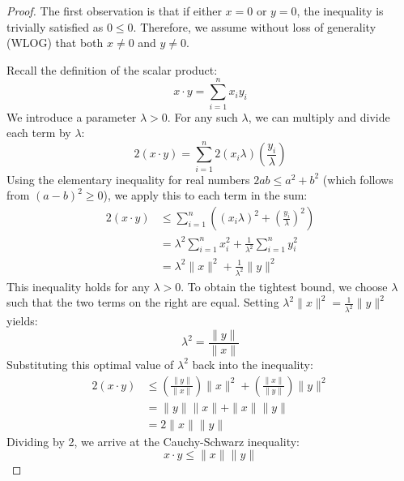\begin{math-stroke}
\begin{proof}
The first observation is that if either $x = 0$ or $y = 0$, the inequality is trivially satisfied as $0 \le 0$. Therefore, we assume without loss of generality (WLOG) that both $x \neq 0$ and $y \neq 0$.

Recall the definition of the scalar product:
\[ x \cdot y = \sum_{i=1}^n x_i y_i \]
We introduce a parameter $\lambda > 0$. For any such $\lambda$, we can multiply and divide each term by $\lambda$:
\[ 2(x \cdot y) = \sum_{i=1}^n 2(x_i \lambda) \left( \frac{y_i}{\lambda} \right) \]
Using the elementary inequality for real numbers $2ab \le a^2 + b^2$ (which follows from $(a-b)^2 \ge 0$), we apply this to each term in the sum:
\begin{align*}
2(x \cdot y) &\le \sum_{i=1}^n \left( (x_i \lambda)^2 + \left( \frac{y_i}{\lambda} \right)^2 \right) \\
&= \lambda^2 \sum_{i=1}^n x_i^2 + \frac{1}{\lambda^2} \sum_{i=1}^n y_i^2 \\
&= \lambda^2 \|x\|^2 + \frac{1}{\lambda^2} \|y\|^2
\end{align*}
This inequality holds for any $\lambda > 0$. To obtain the tightest bound, we choose $\lambda$ such that the two terms on the right are equal. Setting $\lambda^2 \|x\|^2 = \frac{1}{\lambda^2} \|y\|^2$ yields:
\[ \lambda^2 = \frac{\|y\|}{\|x\|} \]
Substituting this optimal value of $\lambda^2$ back into the inequality:
\begin{align*}
2(x \cdot y) &\le \left( \frac{\|y\|}{\|x\|} \right) \|x\|^2 + \left( \frac{\|x\|}{\|y\|} \right) \|y\|^2 \\
&= \|y\|\|x\| + \|x\|\|y\| \\
&= 2\|x\|\|y\|
\end{align*}
Dividing by 2, we arrive at the Cauchy-Schwarz inequality:
\[ x \cdot y \le \|x\|\|y\| \]
\end{proof}
\end{math-stroke}

